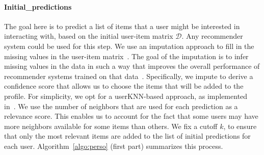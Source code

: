 \documentclass[runningheads]{llncs}
\begin{document}
\paragraph{Initial\_predictions} 
The goal here is to predict a list of items that a user might be interested in interacting with, based on the initial user-item matrix \( \mathcal{D} \). 
Any recommender system could be used for this step. 
We use an imputation approach to fill in the missing values in the user-item matrix~\cite{lakshminarayan1999imputation}. 
The goal of the imputation is to infer missing values in the data in such a way that improves the overall performance of recommender systems trained on that data~\cite{su2008imputed,slokom2021PerBlur}. 
Specifically, we impute to derive a confidence score that allows us to choose the items that will be added to the profile. 
For simplicity, we opt for a userKNN-based approach, as implemented in~\cite{fancyimpute}. 
We use the number of neighbors that are used for each prediction as a relevance score. 
This enables us to account for the fact that some users may have more neighbors available for some items than others. 
We fix a cutoff $k$, 
to ensure that only the most relevant items are added to the list of initial predictions for each user. 
Algorithm~\ref{algo:perso} (first part) summarizes this process. 
\end{document}
